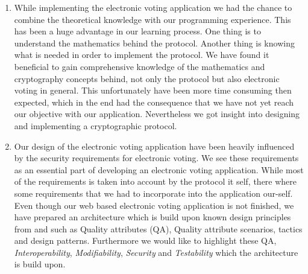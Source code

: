 \begin{enumerate}   
    \item While implementing the electronic voting application we had the chance to combine the theoretical knowledge with our programming experience. This has been a huge advantage in our learning process. One thing is to understand the mathematics behind the protocol. Another thing is knowing what is needed in order to implement the protocol. 
    We have found it beneficial to gain comprehensive knowledge of the mathematics and cryptography concepts behind, not only the protocol but also electronic voting in general. This unfortunately have been more time consuming then expected, which in the end had the consequence that we have not yet reach our objective with our application. Nevertheless  
    we got insight into designing and implementing a cryptographic protocol.
    
    \item Our design of the electronic voting application have been heavily influenced by the security requirements for electronic voting. We see these requirements as an essential part of developing an electronic voting application. While most of the requirements is taken into account by the protocol it self, there where some requirements that we had to incorporate into the application our-self. Even though our web based electronic voting application is not finished, we have prepared an architecture which is build upon known design principles from \cite{Bass} and \cite{Baerbak10} such as Quality attributes (QA), Quality attribute scenarios, tactics and design patterns. Furthermore we would like to highlight these QA, \textit{Interoperability}, \textit{Modifiability}, \textit{Security} and \textit{Testability} which the architecture is build upon.        
\end{enumerate}